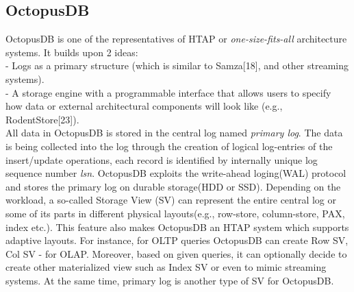 \documentclass[10pt, conference, compsocconf]{IEEEtran}
\begin{document}
\subsection{OctopusDB}
OctopusDB is one of the representatives of HTAP or \textit{one-size-fits-all} architecture systems. %
It builds upon 2 ideas:\\
- Logs as a primary structure (which is similar to Samza[18], and other streaming systems).\\
- A storage engine with a programmable interface that allows users to specify how data or external architectural components will look like (e.g., RodentStore[23]).\\
All data in OctopusDB is stored in the central log named \textit{primary log}. The data is being collected into the log through the creation of logical log-entries of the insert/update operations, each record is identified by internally unique log sequence number \textit{lsn}. OctopusDB exploits the write-ahead loging(WAL) protocol and stores the primary log on durable storage(HDD or SSD). Depending on the workload, a so-called Storage View (SV) can represent the entire central log or some of its parts in different physical layouts(e.g., row-store, column-store, PAX, index etc.). This feature also makes OctopusDB  an HTAP system which supports adaptive layouts.
For instance, for OLTP queries OctopusDB can create Row SV, Col SV - for OLAP. Moreover, based on given queries, it can optionally decide to create other materialized view such as Index SV or even to mimic streaming systems. At the same time, primary log is another type of SV for OctopusDB.  
\end{document}

